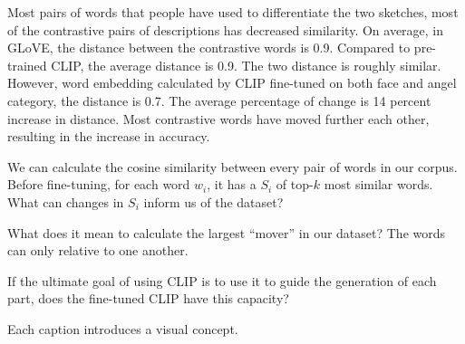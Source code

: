 Most pairs of words that people have used to differentiate the two sketches, most of the contrastive pairs of descriptions has decreased similarity. \citep{styleCLIPPaper}
On average, in GLoVE, the distance between the contrastive words is 0.9. 
Compared to pre-trained CLIP, the average distance is 0.9. The two distance is roughly similar. 
However, word embedding calculated by CLIP fine-tuned on both face and angel category, the distance is 0.7. The average percentage of change is 14 percent increase in distance. Most contrastive words have moved further each other, resulting in the increase in accuracy.

We can calculate the cosine similarity between every pair of words in our corpus. Before fine-tuning, for each word $w_i$, it has a $S_i$ of top-$k$ most similar words. What can changes in $S_i$ inform us of the dataset?  

What does it mean to calculate the largest ``mover'' in our dataset? The words can only relative to one another.  

If the ultimate goal of using CLIP is to use it to guide the generation of each part, does the fine-tuned CLIP have this capacity? 

Each caption introduces a visual concept. 
